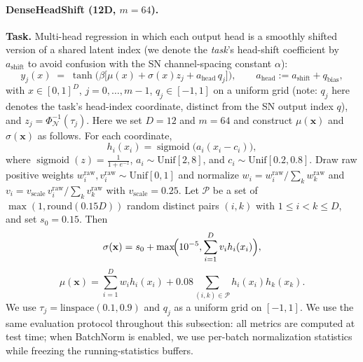 \documentclass{article}
\theoremstyle{plain}
\theoremstyle{definition}
\theoremstyle{remark}
\begin{document}
\paragraph{DenseHeadShift (12D, $m{=}64$).}
\textbf{Task.} Multi-head regression in which each output head is a smoothly shifted version of a shared latent index (we denote the \emph{task}'s head-shift coefficient by $a_{\mathrm{shift}}$ to avoid confusion with the SN channel-spacing constant $\alpha$):
$$y_j(x)\;=\;\tanh\!\Big(\beta\big[\mu(x)+\sigma(x)z_j+a_{\mathrm{head}}\,q_j\big]\Big),\qquad a_{\mathrm{head}}:=a_{\mathrm{shift}}+q_{\mathrm{bias}},$$
with $x\in[0,1]^D$, $j=0,\dots,m{-}1$, $q_j\in[-1,1]$ on a uniform grid (note: $q_j$ here denotes the task's head-index coordinate, distinct from the SN output index $q$), and $z_j=\Phi_{\mathcal{N}}^{-1}(\tau_j)$. Here we set $D=12$ and $m=64$ and construct $\mu(\mathbf{x})$ and $\sigma(\mathbf{x})$ as follows.
For each coordinate,
$$h_i(x_i)=\operatorname{sigmoid}\!\bigl(a_i(x_i-c_i)\bigr),$$
where $\operatorname{sigmoid}(z)=\frac{1}{1+e^{-z}}$, $a_i\sim \mathrm{Unif}[2,8]$, and $c_i\sim \mathrm{Unif}[0.2,0.8]$.
Draw raw positive weights $w_i^{\mathrm{raw}},v_i^{\mathrm{raw}}\sim \mathrm{Unif}[0,1]$ and normalize
$w_i=w_i^{\mathrm{raw}}/\sum_k w_k^{\mathrm{raw}}$ and
$v_i=v_{\mathrm{scale}}\,v_i^{\mathrm{raw}}/\sum_k v_k^{\mathrm{raw}}$ with $v_{\mathrm{scale}}=0.25$.
Let $\mathcal{P}$ be a set of $\max(1,\mathrm{round}(0.15D))$ random distinct pairs $(i,k)$ with $1\le i<k\le D$, and set $s_0=0.15$. Then
$$\sigma(\mathbf{x})=s_0+\max\!\Bigl(10^{-5},\sum_{i=1}^D v_i h_i(x_i)\Bigr),$$
$$\mu(\mathbf{x})=\sum_{i=1}^D w_i h_i(x_i)+0.08\sum_{(i,k)\in\mathcal{P}} h_i(x_i)h_k(x_k).$$ We use $\tau_j=\mathrm{linspace}(0.1,0.9)$ and $q_j$ as a uniform grid on $[-1,1]$. We use the same evaluation protocol throughout this subsection: all metrics are computed at test time; when BatchNorm is enabled, we use per-batch normalization statistics while freezing the running-statistics buffers.
\end{document}
